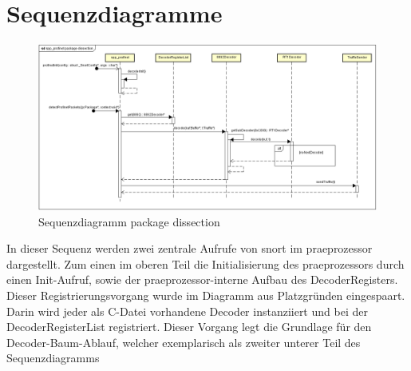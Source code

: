 \chapter{Sequenzdiagramme}

\begin{figure}[H]
  \centering
  \includegraphics[width=\textwidth]{../diagramimages/spp-profinet-package-dissection.png}
  \caption[Sequenzdiagramm \sppname package dissection]{Sequenzdiagramm \sppname package dissection}
\end{figure}

In dieser Sequenz werden zwei zentrale Aufrufe von \gls{snort} im \gls{praeprozessor} \sppname dargestellt. Zum einen im oberen Teil die Initialisierung des \gls{praeprozessor}s durch einen Init-Aufruf, sowie der \gls{praeprozessor}-interne Aufbau des DecoderRegisters. Dieser Registrierungsvorgang wurde im Diagramm aus Platzgründen eingespaart. Darin wird jeder als C-Datei vorhandene Decoder instanziiert und bei der DecoderRegisterList registriert. Dieser Vorgang legt die Grundlage für den Decoder-Baum-Ablauf, welcher exemplarisch als zweiter unterer Teil des Sequenzdiagramms 